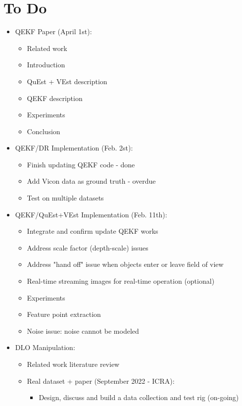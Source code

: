 \documentclass[11pt]{article}
\begin{document}
\section{To Do}
\begin{itemize}
  \item QEKF Paper (April 1st):
  \begin{itemize}
      \item Related work
      \item Introduction
      \item QuEst + VEst description
      \item QEKF description
      \item Experiments
      \item Conclusion
  \end{itemize}
  \item QEKF/DR Implementation (Feb. 2st):
  \begin{itemize}
      \item Finish updating QEKF code - done
      \item Add Vicon data as ground truth - overdue
      \item Test on multiple datasets
  \end{itemize}
  \item QEKF/QuEst+VEst Implementation (Feb. 11th):
  \begin{itemize}
      \item Integrate and confirm update QEKF works
      \item Address scale factor (depth-scale) issues
      \item Address "hand off" issue when objects enter or leave field of view
      \item Real-time streaming images for real-time operation (optional)
      \item Experiments
      \item Feature point extraction
      \item Noise issue: noise cannot be modeled
  \end{itemize}
  \item  DLO Manipulation:
  \begin{itemize}
      \item Related work literature review
      \item Real dataset + paper (September 2022 - ICRA):
      \begin{itemize}
            \item Design, discuss and build a data collection and test rig (on-going)

\end{itemize}
\end{itemize}
\end{itemize}
\end{document}

